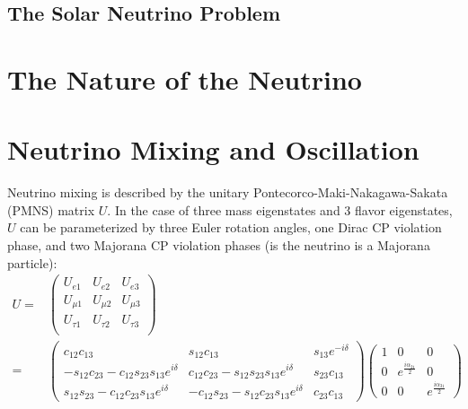 \documentclass[herrin-thesis.tex]{subfiles}
\begin{document}
\subsection{The Solar Neutrino Problem}

\section{The Nature of the Neutrino}

\section{Neutrino Mixing and Oscillation}
Neutrino mixing is described by the unitary Pontecorco-Maki-Nakagawa-Sakata (PMNS) matrix \(U\). In the case of three mass eigenstates and 3 flavor eigenstates, \(U\) can be parameterized by three Euler rotation angles, one Dirac CP violation phase, and two Majorana CP violation phases (is the neutrino is a Majorana particle):
\begin{align}
U =&\begin{pmatrix}
	U_{e1}	&	U_{e2}	& 	U_{e3}	\\
	U_{\mu1}	&	U_{\mu2}	& 	U_{\mu3}	\\
	U_{\tau1}	&	U_{\tau2}	& 	U_{\tau3}	\\
	\end{pmatrix}\\
	=&\begin{pmatrix}
	c_{12}c_{13}							&	s_{12}c_{13}							&	s_{13}e^{-i\delta}	\\
	-s_{12}c_{23}-c_{12}s_{23}s_{13}e^{i\delta}	&	c_{12}c_{23}-s_{12}s_{23}s_{13}e^{i\delta}	&	s_{23}c_{13}		\\
	s_{12}s_{23}-c_{12}c_{23}s_{13}e^{i\delta}	&	-c_{12}s_{23}-s_{12}c_{23}s_{13}e^{i\delta}	&	c_{23}c_{13}
	\end{pmatrix}
	\begin{pmatrix}
	1	&	0					&	0	\\
	0	&	e^{\frac{i\alpha_{21}}{2}}	&	0	\\
	0	&	0					&	e^{\frac{i\alpha_{31}}{2}}
	\end{pmatrix}\nonumber
\label{eq:nu_pmns_matrix}
\end{align}
\end{document}
